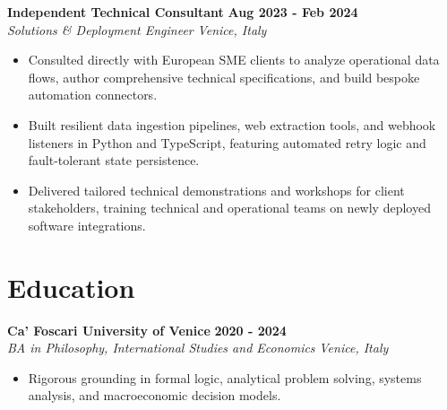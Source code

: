 \documentclass[10pt,a4paper]{article}
\newcommand{\role}[4]{%
  \textbf{#1} \hfill \textbf{#2}\\[1pt]%
  \textit{#3} \hfill \textit{#4}\\[2pt]%
}
\begin{document}
\role{Independent Technical Consultant}{Aug 2023 - Feb 2024}{Solutions \& Deployment Engineer}{Venice, Italy}
\begin{itemize}
  \item Consulted directly with European SME clients to analyze operational data flows, author comprehensive technical specifications, and build bespoke automation connectors.
  \item Built resilient data ingestion pipelines, web extraction tools, and webhook listeners in Python and TypeScript, featuring automated retry logic and fault-tolerant state persistence.
  \item Delivered tailored technical demonstrations and workshops for client stakeholders, training technical and operational teams on newly deployed software integrations.
\end{itemize}

\section{Education}
\role{Ca' Foscari University of Venice}{2020 - 2024}{BA in Philosophy, International Studies and Economics}{Venice, Italy}
\begin{itemize}
  \item Rigorous grounding in formal logic, analytical problem solving, systems analysis, and macroeconomic decision models.
\end{itemize}
\end{document}

